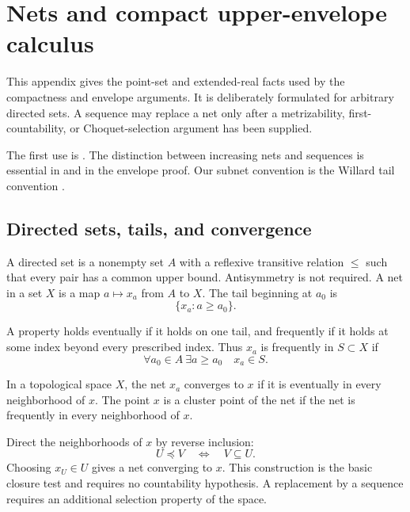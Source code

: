 \chapter{Nets and compact upper-envelope calculus}
\label{app:nets}

This appendix gives the point-set and extended-real facts used by the
compactness and envelope arguments.
It is deliberately formulated for arbitrary directed sets.
A sequence may replace a net only after a metrizability, first-countability,
or Choquet-selection argument has been supplied.

The first use is .
The distinction between increasing nets and sequences is essential in
 and in the envelope proof.
Our subnet convention is the Willard tail convention
\cite[Chapter~4]{Wil70}.

\section{Directed sets, tails, and convergence}
\label{sec:appE-directed}

\begin{definition}
\label{def:appE-directed}
A directed set is a nonempty set \(A\) with a reflexive transitive relation
\(\leq\) such that every pair has a common upper bound.
Antisymmetry is not required.
A net in a set \(X\) is a map \(a\mapsto x_a\) from \(A\) to \(X\).
The tail beginning at \(a_0\) is
\[
                         \{x_a:a\geq a_0\}.
\tag{E.1}\label{eq:appE-tail}
\]
\end{definition}

A property holds eventually if it holds on one tail, and frequently if it
holds at some index beyond every prescribed index.
Thus \(x_a\) is frequently in \(S\subset X\) if
\[
             \forall a_0\in A\ \exists a\geq a_0
             \quad x_a\in S.
\tag{E.2}\label{eq:appE-frequently}
\]

\begin{definition}
\label{def:appE-convergence}
In a topological space \(X\), the net \(x_a\) converges to \(x\) if it is
eventually in every neighborhood of \(x\).
The point \(x\) is a cluster point of the net if the net is frequently in
every neighborhood of \(x\).
\end{definition}

\begin{example}
\label{ex:appE-neighborhood-net}
Direct the neighborhoods of \(x\) by reverse inclusion:
\[
 U\preceq V\quad\Longleftrightarrow\quad V\subseteq U.
\]
Choosing \(x_U\in U\) gives a net converging to \(x\).
This construction is the basic closure test and requires no countability
hypothesis.  A replacement by a sequence requires an additional selection
property of the space.
\end{example}


